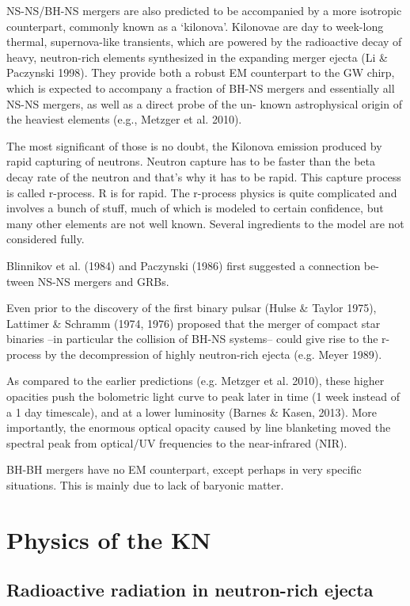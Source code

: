 NS-NS/BH-NS mergers are also predicted to be accompanied by a more isotropic counterpart, commonly known as a `kilonova'. Kilonovae are day to week-long thermal, supernova-like transients, which are powered by the radioactive decay of heavy, neutron-rich elements synthesized in the expanding merger ejecta (Li \& Paczynski 1998). They provide both a robust EM counterpart to the GW chirp, which is expected to accompany a fraction of BH-NS mergers and essentially all NS-NS mergers, as well as a direct probe of the un- known astrophysical origin of the heaviest elements (e.g., Metzger et al. 2010).

The most significant of those is no doubt, the Kilonova emission produced by rapid capturing of neutrons.
Neutron capture has to be faster than the beta decay rate of the neutron and that's why it has to be rapid.
This capture process is called r-process. R is for rapid.
The r-process physics is quite complicated and involves a bunch of stuff, much of which is modeled to certain confidence, but many other elements are not well known. Several ingredients to the model are not considered fully. 

Blinnikov et al. (1984) and Paczynski (1986) first suggested a connection be- tween NS-NS mergers and GRBs.

Even prior to the discovery of the first binary pulsar (Hulse \& Taylor 1975), Lattimer \& Schramm (1974, 1976) proposed that the merger of compact star binaries --in particular the collision of BH-NS systems-- could give rise to the r-process by the decompression of highly neutron-rich ejecta (e.g. Meyer 1989). 

As compared to the earlier predictions (e.g. Metzger et al. 2010), these higher opacities push the bolometric light curve to peak later in time (1 week instead of a 1 day timescale), and at a lower luminosity (Barnes \& Kasen, 2013). More importantly, the enormous optical opacity caused by line blanketing moved the spectral peak from optical/UV frequencies to the near-infrared (NIR).

BH-BH mergers have no EM counterpart, except perhaps in very specific situations. This is mainly due to lack of baryonic matter.

\section{Physics of the KN}


\subsection{Radioactive radiation in neutron-rich ejecta}

